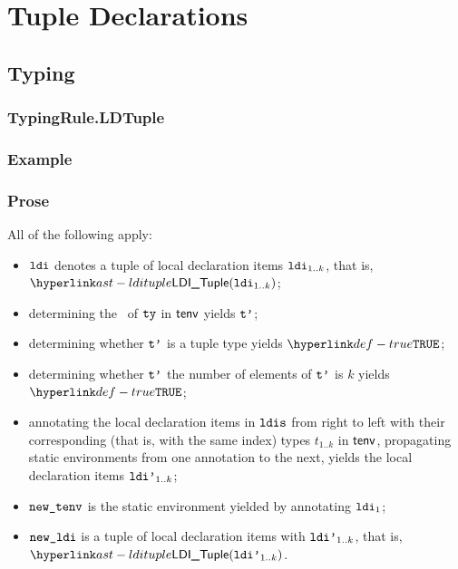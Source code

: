 \section{Tuple Declarations\label{sec:TupleDeclarations}}
\subsection{Typing}
\subsubsection{TypingRule.LDTuple\label{sec:TypingRule.LDTuple}}
\subsubsection{Example}

\subsubsection{Prose}
All of the following apply:
\begin{itemize}
  \item $\texttt{ldi}$ denotes a tuple of local declaration items $\texttt{ldi}_{1..k}$, that is, $\LDITuple(\ldi_{1..k})$;
  \item determining the \structure\ of $\texttt{ty}$ in $\textsf{tenv}$ yields $\texttt{t'}$\ProseOrTypeError;
  \item determining whether $\texttt{t'}$ is a tuple type yields $\True$\ProseOrTypeError;
  \item determining whether $\texttt{t'}$ the number of elements of $\texttt{t'}$ is $k$ yields $\True$\ProseOrTypeError;
  \item annotating the local declaration items in $\texttt{ldis}$ from right to left with their corresponding
        (that is, with the same index) types $t_{1..k}$ in $\textsf{tenv}$,
        propagating static environments from one annotation to the next,
        yields the local declaration items $\texttt{ldi'}_{1..k}$\ProseOrTypeError;
  \item $\texttt{new\_tenv}$ is the static environment yielded by annotating $\texttt{ldi}_1$;
  \item $\texttt{new\_ldi}$ is a tuple of local declaration items with $\texttt{ldi'}_{1..k}$, that is, \\
        $\LDITuple(\ldip_{1..k})$.
\end{itemize}
